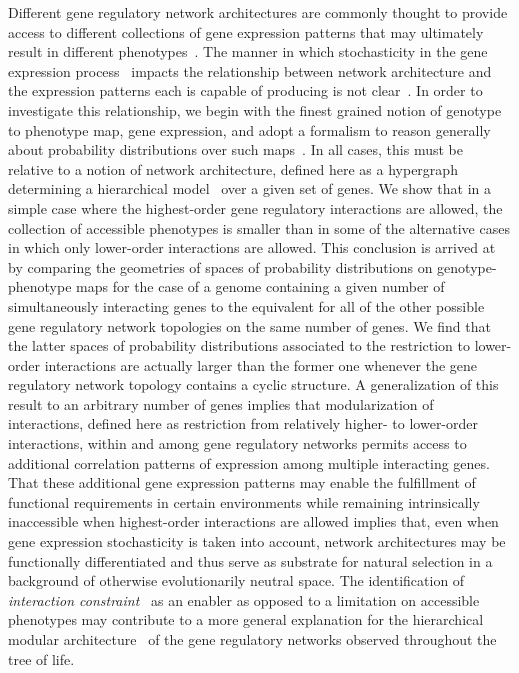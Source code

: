 Different gene regulatory network architectures are commonly thought to provide access to different collections of gene expression patterns that may ultimately result in different phenotypes~\cite{Alon2007}. The manner in which stochasticity in the gene expression process~\cite{Eldar2010,Sanchez2013} impacts the relationship between network architecture and the expression patterns each is capable of producing is not clear~\cite{Jothi2009,Chalancon2012}. In order to investigate this relationship, we begin with the finest grained notion of genotype to phenotype map, gene expression, and adopt a formalism to reason generally about probability distributions over such maps~\cite{Lane1998,MacLane1992,Awodey2006,Abramsky2011}. In all cases, this must be relative to a notion of network architecture, defined here as a hypergraph determining a hierarchical model~\cite{Lauritzen1996} over a given set of genes. We show that in a simple case where the highest-order gene regulatory interactions are allowed, the collection of accessible phenotypes is smaller than in some of the alternative cases in which only lower-order interactions are allowed. This conclusion is arrived at by comparing the geometries of spaces of probability distributions on genotype-phenotype maps for the case of a genome containing a given number of simultaneously interacting genes to the equivalent for all of the other possible gene regulatory network topologies on the same number of genes. We find that the latter spaces of probability distributions associated to the restriction to lower-order interactions are actually larger than the former one whenever the gene regulatory network topology contains a cyclic structure. A generalization of this result to an arbitrary number of genes implies that modularization of interactions, defined here as restriction from relatively higher- to lower-order interactions, within and among gene regulatory networks permits access to additional correlation patterns of expression among multiple interacting genes. That these additional gene expression patterns may enable the fulfillment of functional requirements in certain environments while remaining intrinsically inaccessible when highest-order interactions are allowed implies that, even when gene expression stochasticity is taken into account, network architectures may be functionally differentiated and thus serve as substrate for natural selection in a background of otherwise evolutionarily neutral space. The identification of \emph{interaction constraint}~\cite{Bar-Even2006,Johnson2010a} as an enabler as opposed to a limitation on accessible phenotypes may contribute to a more general explanation for the hierarchical modular architecture~\cite{Ravasz2002,Segre2005,Wagner2007,Erwin2009,Jothi2009,Bhardwaj2010,Colm} of the gene regulatory networks observed throughout the tree of life.

